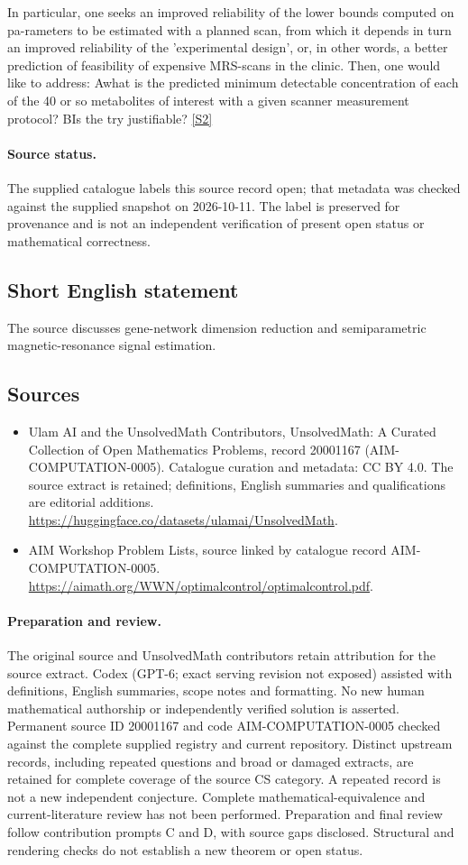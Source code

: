 \documentclass[11pt]{article}
\begin{document}
In particular, one seeks an improved reliability of the lower bounds computed on pa-rameters to be estimated with a planned scan, from which it depends in turn an improved reliability of the 'experimental design', or, in other words, a better prediction of feasibility of expensive MRS-scans in the clinic. Then, one would like to address: Awhat is the predicted minimum detectable concentration of each of the 40 or so metabolites of interest with a given scanner measurement protocol? BIs the try justifiable? \href{https://aimath.org/WWN/optimalcontrol/optimalcontrol.pdf}{[S2]}
\paragraph{Source status.}
The supplied catalogue labels this source record open; that metadata was checked against the supplied snapshot on 2026-10-11. The label is preserved for provenance and is not an independent verification of present open status or mathematical correctness.
\subsection{Short English statement}
The source discusses gene-network dimension reduction and semiparametric magnetic-resonance signal estimation.
\subsection{Sources}
\begin{itemize}
\item[S1] Ulam AI and the UnsolvedMath Contributors, UnsolvedMath: A Curated Collection of Open Mathematics Problems, record 20001167 (AIM-COMPUTATION-0005). Catalogue curation and metadata: CC BY 4.0. The source extract is retained; definitions, English summaries and qualifications are editorial additions.
\url{https://huggingface.co/datasets/ulamai/UnsolvedMath}.
\item[S2] AIM Workshop Problem Lists, source linked by catalogue record AIM-COMPUTATION-0005.
\url{https://aimath.org/WWN/optimalcontrol/optimalcontrol.pdf}.
\end{itemize}
\paragraph{Preparation and review.}
The original source and UnsolvedMath contributors retain attribution for the source extract. Codex (GPT-6; exact serving revision not exposed) assisted with definitions, English summaries, scope notes and formatting. No new human mathematical authorship or independently verified solution is asserted. Permanent source ID 20001167 and code AIM-COMPUTATION-0005 checked against the complete supplied registry and current repository. Distinct upstream records, including repeated questions and broad or damaged extracts, are retained for complete coverage of the source CS category. A repeated record is not a new independent conjecture. Complete mathematical-equivalence and current-literature review has not been performed. Preparation and final review follow contribution prompts C and D, with source gaps disclosed. Structural and rendering checks do not establish a new theorem or open status.
\label{end:20001167}
\end{document}
